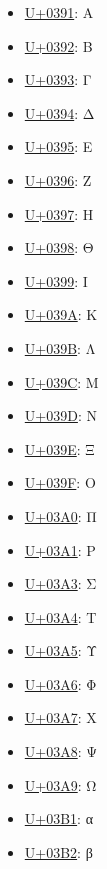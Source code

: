 \begin{itemize}
	\item \href{https://decodeunicode.org/en/u+0391}{U+0391}: Α
	\item \href{https://decodeunicode.org/en/u+0392}{U+0392}: Β
	\item \href{https://decodeunicode.org/en/u+0393}{U+0393}: Γ
	\item \href{https://decodeunicode.org/en/u+0394}{U+0394}: Δ
	\item \href{https://decodeunicode.org/en/u+0395}{U+0395}: Ε
	\item \href{https://decodeunicode.org/en/u+0396}{U+0396}: Ζ
	\item \href{https://decodeunicode.org/en/u+0397}{U+0397}: Η
	\item \href{https://decodeunicode.org/en/u+0398}{U+0398}: Θ
	\item \href{https://decodeunicode.org/en/u+0399}{U+0399}: Ι
	\item \href{https://decodeunicode.org/en/u+039A}{U+039A}: Κ
	\item \href{https://decodeunicode.org/en/u+039B}{U+039B}: Λ
	\item \href{https://decodeunicode.org/en/u+039C}{U+039C}: Μ
	\item \href{https://decodeunicode.org/en/u+039D}{U+039D}: Ν
	\item \href{https://decodeunicode.org/en/u+039E}{U+039E}: Ξ
	\item \href{https://decodeunicode.org/en/u+039F}{U+039F}: Ο
	\item \href{https://decodeunicode.org/en/u+03A0}{U+03A0}: Π
	\item \href{https://decodeunicode.org/en/u+03A1}{U+03A1}: Ρ
	\item \href{https://decodeunicode.org/en/u+03A3}{U+03A3}: Σ
	\item \href{https://decodeunicode.org/en/u+03A4}{U+03A4}: Τ
	\item \href{https://decodeunicode.org/en/u+03A5}{U+03A5}: Υ
	\item \href{https://decodeunicode.org/en/u+03A6}{U+03A6}: Φ
	\item \href{https://decodeunicode.org/en/u+03A7}{U+03A7}: Χ
	\item \href{https://decodeunicode.org/en/u+03A8}{U+03A8}: Ψ
	\item \href{https://decodeunicode.org/en/u+03A9}{U+03A9}: Ω
	\item \href{https://decodeunicode.org/en/u+03B1}{U+03B1}: α
	\item \href{https://decodeunicode.org/en/u+03B2}{U+03B2}: β

\end{itemize}
